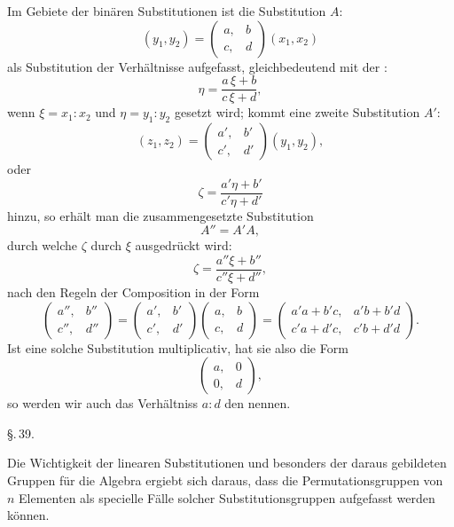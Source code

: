 
Im Gebiete der binären Substitutionen ist die Substitution $A$:
\[
(y_1, y_2) = \begin{pmatrix} a, & b \\ c, & d \end{pmatrix} (x_1, x_2)
\]
als Substitution der Verhältnisse aufgefasst, gleichbedeutend mit der :
\[
\eta = \frac{a\,\xi + b}{c\,\xi + d},
\]
wenn $\xi = x_1 : x_2$ und $\eta = y_1 : y_2$ gesetzt wird; kommt eine zweite Substitution $A'$:
\[
(z_1, z_2) = \begin{pmatrix} a', & b' \\ c', & d' \end{pmatrix} (y_1, y_2),
\]
oder
\[
\zeta = \frac{a'\eta + b'}{c'\eta + d'}
\]
hinzu, so erhält man die zusammengesetzte Substitution
\[
A'' = A'A,
\]
durch welche $\zeta$ durch $\xi$ ausgedrückt wird:
\[
\zeta = \frac{a''\xi + b''}{c''\xi + d''},
\]
nach den Regeln der Composition in der Form
\[
\begin{pmatrix} a'', & b'' \\ c'', & d'' \end{pmatrix} = \begin{pmatrix} a', & b' \\ c', & d' \end{pmatrix} \begin{pmatrix} a, & b \\ c, & d \end{pmatrix} = \begin{pmatrix} a'a + b'c, & a'b + b'd \\ c'a + d'c, & c'b + d'd \end{pmatrix}.
\]
Ist eine solche Substitution multiplicativ, hat sie also die Form
\[
\begin{pmatrix} a, & 0 \\ 0, & d \end{pmatrix},
\]
so werden wir auch das Verhältniss $a : d$ den  nennen.

\begin{center}
\S.\,39.

\end{center}

Die Wichtigkeit der linearen Substitutionen und besonders der daraus gebildeten  Gruppen für die Algebra ergiebt sich daraus, dass die Permutationsgruppen von $n$ Elementen als specielle Fälle solcher Substitutionsgruppen aufgefasst werden können.
